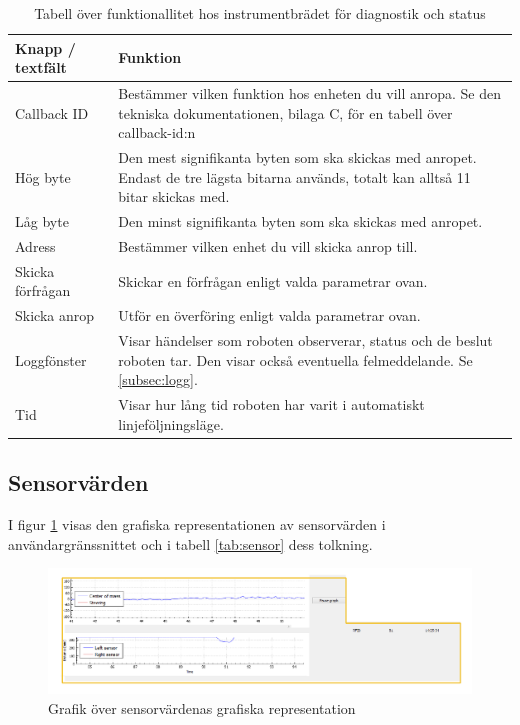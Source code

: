\documentclass[a4paper,12pt]{article}
\begin{document}
\begin{table}[H]
    \centering
    \begin{tabularx}{\textwidth}{|l|X|}
        \hline \textbf{Knapp / textfält} & \textbf{Funktion} \\ \hline
        Callback ID & Bestämmer vilken funktion hos enheten du vill anropa. Se den tekniska dokumentationen, bilaga C, för en tabell över callback-id:n \\ \hline
        Hög byte & Den mest signifikanta byten som ska skickas med anropet. Endast de tre lägsta bitarna används, totalt kan alltså 11 bitar skickas med. \\ \hline
        Låg byte & Den minst signifikanta byten som ska skickas med anropet. \\ \hline
        Adress & Bestämmer vilken enhet du vill skicka anrop till. \\ \hline
        Skicka förfrågan & Skickar en förfrågan enligt valda parametrar ovan. \\ \hline
        Skicka anrop & Utför en överföring enligt valda parametrar ovan. \\ \hline
        Loggfönster & Visar händelser som roboten observerar, status och de beslut roboten tar. Den visar också eventuella felmeddelande. Se \ref{subsec:logg}.\\ \hline
        Tid & Visar hur lång tid roboten har varit i automatiskt linjeföljningsläge. \\ \hline
    \end{tabularx}
\caption{Tabell över funktionallitet hos instrumentbrädet för diagnostik och status}
\label{tab:diag}
\end{table}

\subsection{Sensorvärden}
\label{subsec:sensor}
I figur \ref{fig:pc_sensor} visas den grafiska representationen av sensorvärden i användargränssnittet och i tabell \ref{tab:sensor} dess tolkning.

\begin{figure}[H]
	\centering
	\includegraphics[width=1.0\textwidth]{sensor.pdf}
	\caption{Grafik över sensorvärdenas grafiska representation}
	\label{fig:pc_sensor}
\end{figure}
\end{document}

